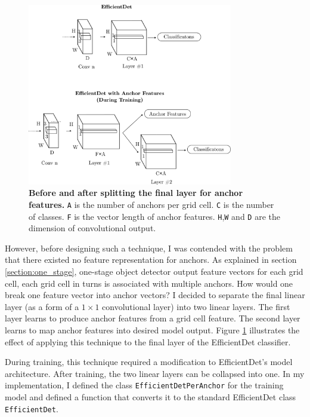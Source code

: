 \documentclass[12pt,a4paper,twoside,openany]{report}
\begin{document}
\begin{figure}[H]
    \centering
    \includegraphics[width=0.8\textwidth]{figs/implementation/efficientdet_new_head.png}
    \caption{\textbf{Before and after splitting the final layer for anchor features.} \texttt{A} is the number of anchors per grid cell. \texttt{C} is the number of classes. \texttt{F} is the vector length of anchor features. \texttt{H},\texttt{W} and \texttt{D} are the dimension of convolutional output.}
    \label{fig:edet_new_head}
\end{figure}

However, before designing such a technique, I was contended with the problem that there existed no feature representation for anchors. As explained in section \ref{section:one_stage}, one-stage object detector output feature vectors for each grid cell, each grid cell in turns is associated with multiple anchors. How would one break one feature vector into anchor vectors? I decided to separate the final linear layer (as a form of a $1\times1$ convolutional layer) into two linear layers. The first layer learns to produce anchor features from a grid cell feature. The second layer learns to map anchor features into desired model output. Figure \ref{fig:edet_new_head} illustrates the effect of applying this technique to the final layer of the EfficientDet classifier.

During training, this technique required a modification to EfficientDet's model architecture. After training, the two linear layers can be collapsed into one. In my implementation, I defined the class \verb|EfficientDetPerAnchor| for the training model and defined a function that converts it to the standard EfficientDet class \verb|EfficientDet|. 
\end{document}
